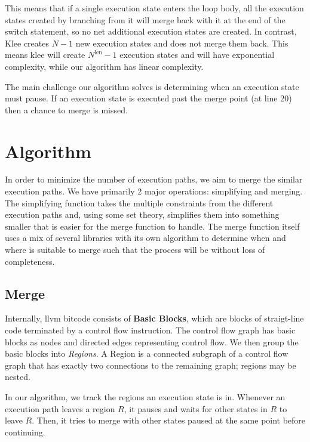\documentclass[12pt,a4paper]{article}
\begin{document}
This means that if a single execution state enters the loop body, all the execution states created by branching from it will merge back with it at the end of the switch statement, so no net additional execution states are created. In contrast, Klee creates $N-1$ new execution states and does not merge them back. This means klee will create $N^\text{len} - 1$ execution states and will have exponential complexity, while our algorithm has linear complexity.

The main challenge our algorithm solves is determining when an execution state must pause. If an execution state is executed past the merge point (at line 20) then a chance to merge is missed.

\section{Algorithm}\label{algorithm}
In order to minimize the number of execution paths, we aim to merge the similar execution paths. We have primarily 2 major operations: simplifying and merging. The simplifying function takes the multiple constraints from the different execution paths and, using some set theory, simplifies them into something smaller that is easier for the merge function to handle. The merge function itself uses a mix of several libraries with its own algorithm to determine when and where is suitable to merge such that the process will be without loss of completeness.

\subsection{Merge}
Internally, llvm bitcode consists of \textbf{Basic Blocks}, which are blocks of straigt-line code terminated by a control flow instruction. The control flow graph has basic blocks as nodes and directed edges representing control flow. We then group the basic blocks into \emph{Regions}. A Region is a connected subgraph of a control flow graph that has exactly two connections to the remaining graph; regions may be nested. 

In our algorithm, we track the regions an execution state is in. Whenever an execution path leaves a region $R$, it pauses and waits for other states in $R$ to leave $R$. Then, it tries to merge with other states paused at the same point before continuing.

\end{document}
